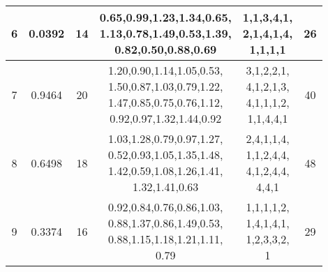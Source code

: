 \begin{latin}
\begin{tabular}{|c|c|c|c|c|c|}
    \hline
    6 & 0.0392 & 14 & \makecell{0.65,0.99,1.23,1.34,0.65,\\1.13,0.78,1.49,0.53,1.39,\\0.82,0.50,0.88,0.69} & \makecell{1,1,3,4,1,\\2,1,4,1,4,\\1,1,1,1} & 26 \\
    \hline
    7 & 0.9464 & 20 & \makecell{1.20,0.90,1.14,1.05,0.53,\\1.50,0.87,1.03,0.79,1.22,\\1.47,0.85,0.75,0.76,1.12,\\0.92,0.97,1.32,1.44,0.92} & \makecell{3,1,2,2,1,\\4,1,2,1,3,\\4,1,1,1,2,\\1,1,4,4,1} & 40 \\
    \hline
    8 & 0.6498 & 18 & \makecell{1.03,1.28,0.79,0.97,1.27,\\0.52,0.93,1.05,1.35,1.48,\\1.42,0.59,1.08,1.26,1.41,\\1.32,1.41,0.63} & \makecell{2,4,1,1,4,\\1,1,2,4,4,\\4,1,2,4,4,\\4,4,1} 
    & 48 \\
    \hline
    9 & 0.3374 & 16 & \makecell{0.92,0.84,0.76,0.86,1.03,\\0.88,1.37,0.86,1.49,0.53,\\0.88,1.15,1.18,1.21,1.11,\\0.79} & \makecell{1,1,1,1,2,\\1,4,1,4,1,\\1,2,3,3,2,\\1} & 29 \\       
    \hline
\end{tabular}\end{latin}